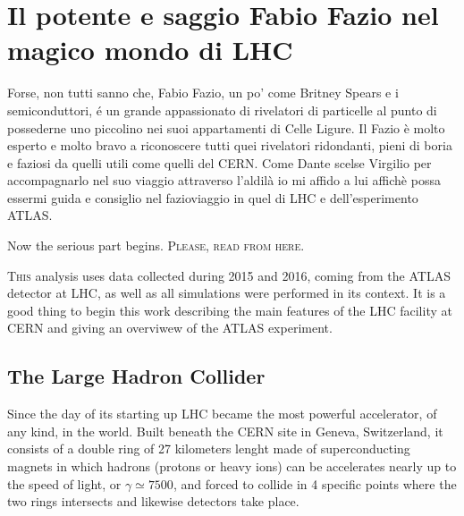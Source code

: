 \chapter{Il potente e saggio Fabio Fazio nel magico mondo di LHC}
Forse, non tutti sanno che, Fabio Fazio, un po' come Britney Spears e i semiconduttori, \'e un grande appassionato di rivelatori di particelle al punto di possederne uno piccolino nei suoi appartamenti di Celle Ligure. Il Fazio \`e molto esperto e molto bravo a riconoscere tutti quei rivelatori ridondanti, pieni di boria e faziosi da quelli utili come quelli del CERN. Come Dante scelse Virgilio per accompagnarlo nel suo viaggio attraverso l'aldil\`a io mi affido a lui affich\`e possa essermi guida e consiglio nel fazioviaggio in quel di LHC e dell'esperimento ATLAS.

Now the serious part begins. {\scshape Please, read from here.}

\lettrine{T}{his} analysis uses data collected during 2015 and 2016, coming from the ATLAS detector at LHC, as well as all simulations were performed in its context. It is a good thing to begin this work describing the main features of the LHC facility at CERN and giving an overviwew of the ATLAS experiment.

\section{The Large Hadron Collider}
Since the day of its starting up LHC became the most powerful accelerator, of any kind, in the world. Built beneath the CERN site in Geneva, Switzerland, it consists of a double ring of 27 kilometers lenght made of superconducting magnets in which hadrons (protons or heavy ions) can be accelerates nearly up to the speed of light, or $\gamma\simeq7500$, and forced to collide in 4 specific points where the two rings intersects and likewise detectors take place.

